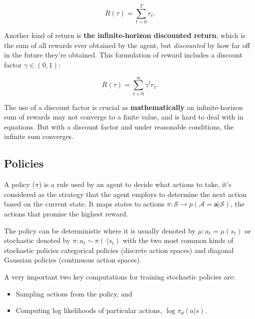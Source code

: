 \begin{center}
	\begin{equation} \label{eq:1}
		R(\tau)=\sum_{t=0}^{T} r_{t}.
	\end{equation}
\end{center}

Another kind of return is \textbf{the infinite-horizon discounted return}, which is the sum of all rewards ever obtained by the agent, but \textit{discounted} by how far off in the future they’re obtained. This formulation of reward includes a discount factor \(\gamma \in(0,1)\):

\begin{center}
	\begin{equation} \label{eq:2}
		R(\tau)=\sum_{t=0}^{\infty} \gamma^{t} r_{t}.
	\end{equation}
\end{center}

The use of a discount factor is crucial as \textbf{mathematically} an infinite-horizon sum of rewards may not converge to a finite value, and is hard to deal with in equations. But with a discount factor and under reasonable conditions, the infinite sum converges.

\subsection{Policies}

A policy ($\pi$) is a rule used by an agent to decide what actions to take, it's considered as the strategy that the agent employs to determine the next action based on the current state. It maps states to actions $ \pi : \mathcal{S} \rightarrow p(\mathcal{A}=\mathbf{a} | \mathcal{S}) $, the actions that promise the highest reward.

The policy can be deterministic where it is usually denoted by $ \mu: a_{t}=\mu\left(s_{t}\right) $
or stochastic denoted by $ \pi:  a_{t} \sim \pi\left(\cdot | s_{t}\right) $
with the two most common kinds of stochastic policies categorical policies (discrete action spaces) and diagonal Gaussian policies (continuous action spaces).

A very important two key computations for training stochastic policies are:
\begin{itemize}
	\item Sampling actions from the policy, and
	\item Computing log likelihoods of particular actions, $ \log \pi_{\theta}(a|s) $.
\end{itemize}



